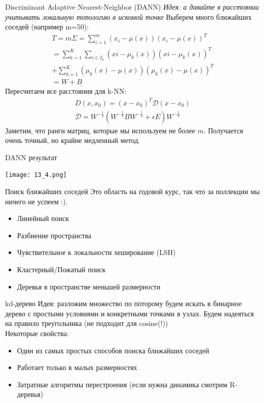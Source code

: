 \documentclass[14pt, fleqn, xcolor={dvipsnames, table}]{beamer}
\begin{document}
\begin{frame}{Discriminant Adaptive Nearest-Neighbor (DANN)}
\small
\emph{Идея: а давайте в расстоянии учитывать локальную топологию в искомой точке}
Выберем много ближайших соседей (например m=50): \\
$$
  \begin{array}{l}
    T = m\Sigma = \sum_{i=1}^m(x_i - \mu(x))(x_i - \mu(x))^T \\
    = \sum_{k=1}^K \sum_{i \in I_k} (xi - \mu_k(x))(xi - \mu_k(x))^T \\
    + \sum_{k=1}^K(\mu_k(x) - \mu(x))(\mu_k(x) - \mu(x))^T \\ 
    = W + B
  \end{array}
$$
Пересчитаем все расстояния для k-NN:
$$
  \begin{array}{l}
    D(x, x_0) = (x - x_0)^T \mathcal{D}(x - x_0) \\
    \mathcal{D}=W^{-\frac{1}{2}} (W^{-\frac{1}{2}} B W^{-\frac{1}{2}} + \epsilon E) W^{-\frac{1}{2}}
  \end{array}
$$
Заметим, что ранги матриц, которые мы используем не более $m$. Получается очень точный, но крайне медленный метод.
\end{frame}

\begin{frame}{DANN результат}
\begin{center}
\texttt{[image: 13\_4.png]}
\end{center}
\end{frame}

\begin{frame}{Поиск ближайших соседей}
  Это область на годовой курс, так что за поллекции мы ничего не успеем :).
  \begin{itemize}
    \item Линейный поиск
    \item Разбиение пространства
    \item Чувствительное к локальности хеширование (LSH)
    \item Кластерный/Пожатый поиск
    \item Деревья в пространстве меньшей размерности
  \end{itemize}
\end{frame}

\begin{frame}{kd-дерево}
  Идея: разложим множество по поторому будем искать в бинарное дерево с простыми условиями и конкретными точками в узлах. Будем надеяться на правило треугольника (не подходит для cosine(!)) \\
  Некоторые свойства:
  \begin{itemize}
    \item Один из самых простых способов поиска ближайших соседей
    \item Работает только в малых размерностях
    \item Затратные алгоритмы перестроения (если нужна динамика смотрим R-деревья)
  \end{itemize}  
\end{frame}
\end{document}
